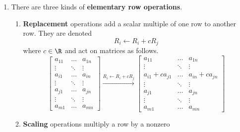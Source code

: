 \begin{enumerate}
  \textit{Examples.}
  \begin{itemize}
  \item As noted above, the linear system in \ref{lin-sys-ex-1} is consistent.
  \item The following linear system is inconsistent.  It represents
    two parallel lines in $\R^2$.
    \begin{align*}
      2x - 3y &= 4 \\
      -4x + 6y &= 5
    \end{align*}
  \end{itemize}

\item There are three kinds of \textbf{elementary row operations}.
  \begin{enumerate}
  \item \textbf{Replacement} operations add a scalar multiple of one
    row to another row.  They are denoted
    \begin{displaymath}
      R_i \gets R_i + cR_j
    \end{displaymath}
    where $c \in \R$ and act on matrices as follows.
    \begin{displaymath}
      \begin{bmatrix}
        a_{11} & \dots & a_{1n} \\
        \vdots & \ddots & \vdots \\
        a_{i1} & \dots & a_{in} \\
        \vdots & \ddots & \vdots \\
        a_{j1} & \dots & a_{jn} \\
        \vdots & \ddots & \vdots \\
        a_{m1} & \dots & a_{mn}
      \end{bmatrix}
      \xrightarrow{R_i \gets R_i + cR_j}
      \begin{bmatrix}
        a_{11} & \dots & a_{1n} \\
        \vdots & \ddots & \vdots \\
        a_{i1} + ca_{j1} & \dots & a_{in} + ca_{jn} \\
        \vdots & \ddots & \vdots \\
        a_{j1} & \dots & a_{jn} \\
        \vdots & \ddots & \vdots \\
        a_{m1} & \dots & a_{mn}
      \end{bmatrix}
    \end{displaymath}
  \item \textbf{Scaling} operations multiply a row by a nonzero

\end{enumerate}
\end{enumerate}
